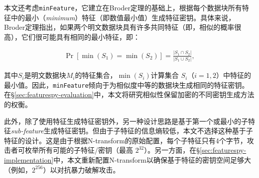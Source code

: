本文还考虑{\tt minFeature}，它建立在Broder定理\cite{broder1997resemblance}的基础上，根据每个数据块所有特征中的最小（{\em minimum}）特征（即数值最小值）生成特征密钥。具体来说，Broder定理指出，如果两个明文数据块具有许多共同特征（即，相似的概率很高），它们很可能具有相同的最小特征，即：

\begin{eqnarray}
  \label{eq:featurespy-broder}
 \Pr[\min(S_1) = \min(S_2)] = \frac{|S_1 \cap S_2|}{|S_1 \cup S_2|},
\end{eqnarray}

其中$S_i$是明文数据块$M_i$的特征集合，$\min(S_i)$计算集合 $S_i$（$i = 1, 2$）中特征的最小值。因此，{\tt minFeature}倾向于为相似度中等的数据块生成相同的特征密钥。在\S\ref{sec:featurespy-evaluation}中，本文将研究相似性保留加密的不同密钥生成方法的权衡。

此外，除了使用特征生成特征密钥外，另一种设计思路是基于第一个或最小的子特征{\em sub-feature}生成特征密钥。但由于子特征的信息熵较低，本文不选择这种基于子特征的设计。这是由于根据N-transform的原始配置\cite{shilane12}，每个子特征只有4个字节，攻击者可枚举所有可能的子特征/密钥（最高 $2^{32}$）。另一方面，在\S\ref{sec:featurespy-implementation}中，本文重新配置N-transform以确保基于特征的密钥空间足够大（例如，$2^{256}$）以对抗暴力破解攻击。